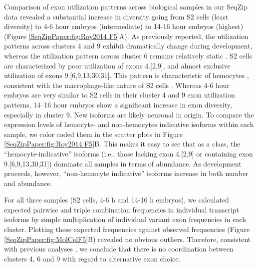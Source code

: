 		Comparison of exon utilization patterns across biological samples in our SeqZip data revealed a substantial increase in diversity going from S2 cells (least diversity) to 4-6 hour embryos (intermediate) to 14-16 hour embryos (highest) (Figure \ref{SeqZipPaper:fig:Roy2014 F5}A). As previously reported, the utilization patterns across clusters 4 and 9 exhibit dramatically change during development, whereas the utilization pattern across cluster 6 remains relatively static \citep{Celotto2001,Neves2004,Zhan2004,Sun2013,Miura2013b}. S2 cells are characterized by poor utilization of exons 4.[2,9], and almost exclusive utilization of exons 9.[6,9,13,30,31]. This pattern is characteristic of hemocytes \citep{Watson2005}, consistent with the macrophage-like nature of S2 cells \citep{Schneider1972}. Whereas 4-6 hour embryos are very similar to S2 cells in their cluster 4 and 9 exon utilization patterns, 14–16 hour embryos show a significant increase in exon diversity, especially in cluster 9. New isoforms are likely neuronal in origin. To compare the expression levels of hemocyte- and non-hemocytes indicative isoforms within each sample, we color coded them in the scatter plots in Figure \ref{SeqZipPaper:fig:Roy2014 F5}B. This makes it easy to see that as a class, the ``hemocyte-indicative'' isoforms (i.e., those lacking exon 4.[2,9] or containing exon 9.[6,9,13,30,31]) dominate all samples in terms of abundance. As development proceeds, however, ``non-hemocyte indicative'' isoforms increase in both number and abundance.

		For all three samples (S2 cells, 4-6 h and 14-16 h embryos), we calculated expected pairwise and triple combination frequencies in individual transcript isoforms by simple multiplication of individual variant exon frequencies in each cluster. Plotting these expected frequencies against observed frequencies (Figure \ref{SeqZipPaper:fig:MolCelF5}B) revealed no obvious outliers. Therefore, consistent with previous analyses \citep{Neves2004,Sun2013}, we conclude that there is no coordination between \dscam{} clusters 4, 6 and 9 with regard to alternative exon choice.
			
